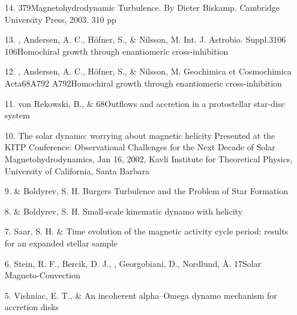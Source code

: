 \begin{itemize}
\item[14.]
\Brandenburg{}
{379}{Magnetohydrodynamic Turbulence. By Dieter Biskamp. Cambridge
University Press, 2003. 310 pp}

\item[13.]
\Brandenburg, Andersen, A. C., H\"ofner, S., \& Nilsson, M.
{Int. J. Astrobio. Suppl.}{3}{106}
{106}{Homochiral growth through enantiomeric cross-inhibition}

\item[12.]
\Brandenburg, Andersen, A. C., H\"ofner, S., \& Nilsson, M.
{Geochimica et Cosmochimica Acta}{68}{A792}
{A792}{Homochiral growth through enantiomeric cross-inhibition}

\item[11.]
von Rekowski, B., \& \Brandenburg{}
{68}{Outflows and accretion in a protostellar star-disc system}

\item[10.]
\Brandenburg{}
{The solar dynamo: worrying about magnetic helicity}
{Presented at the KITP Conference: Observational Challenges for the Next
Decade of Solar Magnetohydrodynamics, Jan 16, 2002, Kavli Institute for
Theoretical Physics, University of California, Santa Barbara}

\item[9.]
\Brandenburg \& Boldyrev, S. H.
{Burgers Turbulence and the Problem of Star Formation}

\item[8.]
\Brandenburg \& Boldyrev, S. H.
{Small-scale kinematic dynamo with helicity}

\item[7.]
Saar, S. H. \& \Brandenburg{}
{Time evolution of the magnetic activity cycle period:
results for an expanded stellar sample}

\item[6.]
Stein, R. F., Bercik, D. J., \Brandenburg, Georgobiani, D.,
Nordlund, \AA.
{17}{Solar Magneto-Convection}

\item[5.]
Vishniac, E. T., \& \Brandenburg{}
{An incoherent alpha--Omega dynamo mechanism for accretion disks}


\end{itemize}

